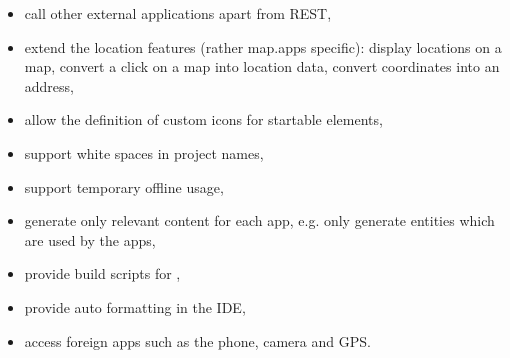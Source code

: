 \begin{itemize}
\item call other external applications apart from REST,
\item extend the location features (rather map.apps specific):
\subitem display locations on a map,
\subitem convert a click on a map into location data,
\subitem convert coordinates into an address,
\item allow the definition of custom icons for startable elements,
\item support white spaces in project names,
\item support temporary offline usage,
\item generate only relevant content for each app, e.g. only generate entities which are used by the apps,
\item provide build scripts for \MD,
\item provide auto formatting in the IDE,
\item access foreign apps such as the phone, camera and GPS.
\end{itemize}


